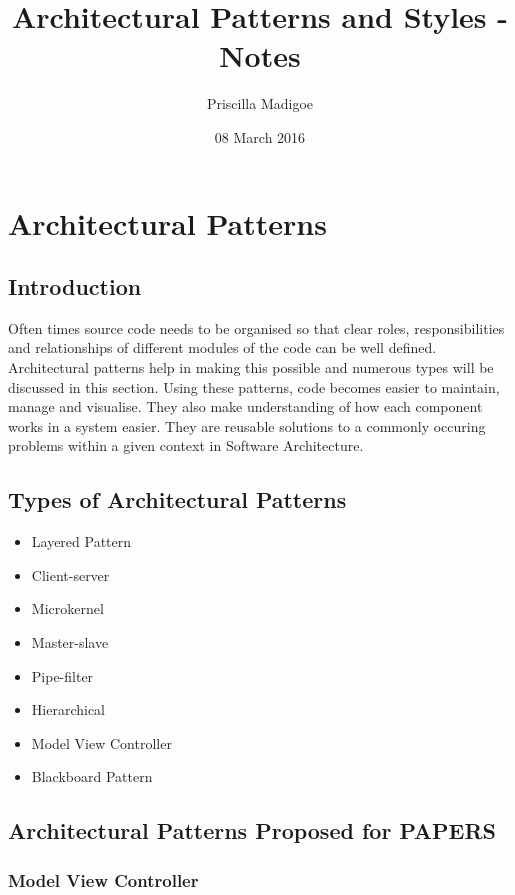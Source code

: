 \documentclass[a4paper,12pt]{article}
\begin{document}
\title{Architectural Patterns and Styles - Notes}
\author{Priscilla Madigoe}
\date{08 March 2016}
\maketitle
 
\section{Architectural Patterns}

\subsection{Introduction}
Often times source code needs to be organised so that clear roles, responsibilities and relationships of different modules of the code can be well defined. Architectural patterns help in making this possible and numerous types will be discussed in this section. Using these patterns, code becomes easier to maintain, manage and visualise. They also make understanding of how each component works in a system easier. They are reusable solutions to a commonly occuring problems within a given context in Software Architecture.

\subsection{Types of Architectural Patterns}

\begin{itemize}
\item Layered Pattern
\item Client-server
\item Microkernel
\item Master-slave
\item Pipe-filter
\item Hierarchical
\item Model View Controller
\item Blackboard Pattern
\end{itemize}

\subsection{Architectural Patterns Proposed for PAPERS}


\subsubsection{Model View Controller}
\end{document}
